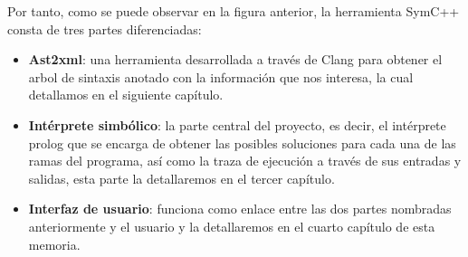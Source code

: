 Por tanto, como se puede observar en la figura anterior, la herramienta SymC++ consta de tres partes diferenciadas:

\begin{itemize}
\item \textbf{Ast2xml}: una herramienta desarrollada a trav\'es de Clang para obtener el arbol de sintaxis anotado con la informaci\'on que nos interesa, la cual detallamos en el siguiente cap\'itulo.
\item \textbf{Int\'erprete simb\'olico}: la parte central del proyecto, es decir, el int\'erprete prolog que se encarga de obtener las posibles soluciones para cada una de las ramas del programa, as\'i como la traza de ejecuci\'on a trav\'es de sus entradas y salidas, esta parte la detallaremos en el tercer cap\'itulo.
\item \textbf{Interfaz de usuario}: funciona como enlace entre las dos partes nombradas anteriormente y el usuario y la detallaremos en el cuarto cap\'itulo de esta memoria.
\end{itemize}







